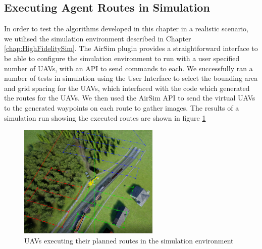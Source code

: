 \subsection{Executing Agent Routes in Simulation}\label{subsec:routesInSimulation}
In order to test the algorithms developed in this chapter in a realistic scenario, we utilised the simulation environment described in Chapter \ref{chap:HighFidelitySim}. The AirSim plugin \cite{Shah2017AirSim:Vehicles} provides a straightforward interface to be able to configure the simulation environment to run with a user specified number of UAVs, with an API to send commands to each. We successfully ran a number of tests in simulation using the User Interface to select the bounding area and grid spacing for the UAVs, which interfaced with the code which generated the routes for the UAVs. We then used the AirSim API to send the virtual UAVs to the generated waypoints on each route to gather images. The results of a simulation run showing the executed routes are shown in figure \ref{fig:VirtualPlannedRoutes}


\begin{figure}
    \centering
    \includegraphics[width=0.6\textwidth]{Chapters/SimulationEnv/Figs/DebuggingLines/RoutesWithRAVsVisible.png}
    \caption{UAVs executing their planned routes in the simulation environment}
    \label{fig:VirtualPlannedRoutes}
\end{figure}